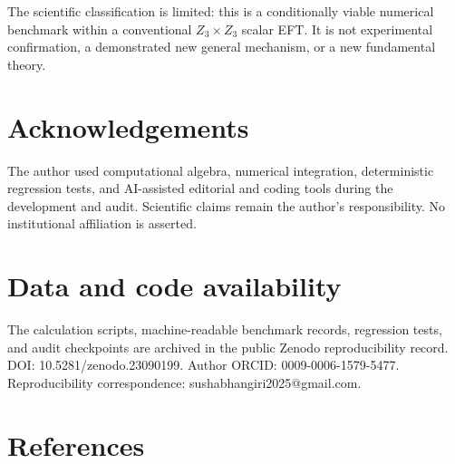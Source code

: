 \documentclass[
]{article}
\begin{document}
The scientific classification is limited: this is a conditionally viable
numerical benchmark within a conventional \(Z_3\times Z_3\) scalar EFT.
It is not experimental confirmation, a demonstrated new general
mechanism, or a new fundamental theory.

\hypertarget{acknowledgements}{%
\section{Acknowledgements}\label{acknowledgements}}

The author used computational algebra, numerical integration,
deterministic regression tests, and AI-assisted editorial and coding
tools during the development and audit. Scientific claims remain the
author's responsibility. No institutional affiliation is asserted.

\hypertarget{data-and-code-availability}{%
\section{Data and code availability}\label{data-and-code-availability}}

The calculation scripts, machine-readable benchmark records, regression
tests, and audit checkpoints are archived in the public Zenodo
reproducibility record. DOI: 10.5281/zenodo.23090199. Author ORCID:
0009-0006-1579-5477. Reproducibility correspondence:
sushabhangiri2025@gmail.com.

\hypertarget{references}{%
\section{References}\label{references}}
\end{document}
